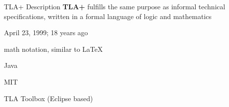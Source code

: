 \documentclass[12pt]{beamer}
\begin{document}
  \begin{frame}{TLA+ Description}
      \textbf{TLA+} fulfills the same purpose as informal technical
      specifications, written in a formal language of logic and mathematics
      \begin{description}[align=right]
        \item [Released] April 23, 1999; 18 years ago
        \item [Syntax] math notation, similar to \LaTeX
        \item [Implem.] Java
        \item [License] MIT
        \item [IDE] TLA Toolbox (Eclipse based) \cite{azurewebsites}
      \end{description}
  \end{frame}
\end{document}

